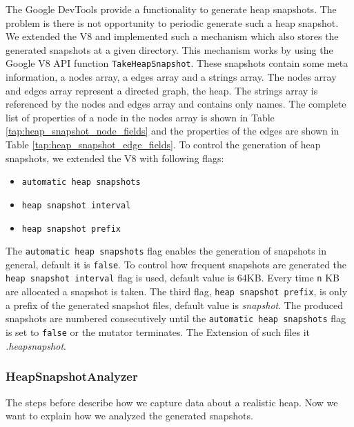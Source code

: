 The Google DevTools \cite{DevTools} provide a functionality to generate heap snapshots. The problem is there is not opportunity to periodic generate such a heap snapshot. We extended the V8 and implemented such a mechanism which also stores the generated snapshots at a given directory. This mechanism works by using the Google V8 API function \texttt{TakeHeapSnapshot}. These snapshots contain some meta information, a nodes array, a edges array and a strings array. The nodes array and edges array represent a directed graph, the heap. The strings array is referenced by the nodes and edges array and contains only names. The complete list of properties of a node in the nodes array is shown in Table \ref{tap:heap_snapshot_node_fields} and the properties of the edges are shown in Table \ref{tap:heap_snapshot_edge_fields}. To control the generation of heap snapshots, we extended the V8 with following flags:
\begin{itemize}
	\item \texttt{automatic heap snapshots}
	\item \texttt{heap snapshot interval}
	\item \texttt{heap snapshot prefix} 
\end{itemize}	
The \texttt{automatic heap snapshots} flag enables the generation of snapshots in general, default it is \texttt{false}. To control how frequent snapshots are generated the \texttt{heap snapshot interval} flag is used, default value is 64KB. Every time \texttt{n} KB are allocated a snapshot is taken. The third flag, \texttt{heap snapshot prefix}, is only a prefix of the generated snapshot files, default value is \textit{snapshot}. The produced snapshots are numbered consecutively until the \texttt{automatic heap snapshots} flag is set to \texttt{false} or the mutator terminates. The Extension of such files it \textit{.heapsnapshot}. 


\subsubsection{HeapSnapshotAnalyzer} \label{sec:heap_snapshot_analyzer}
The steps before describe how we capture data about a realistic \JS heap. Now we want to explain how we analyzed the generated snapshots. 

